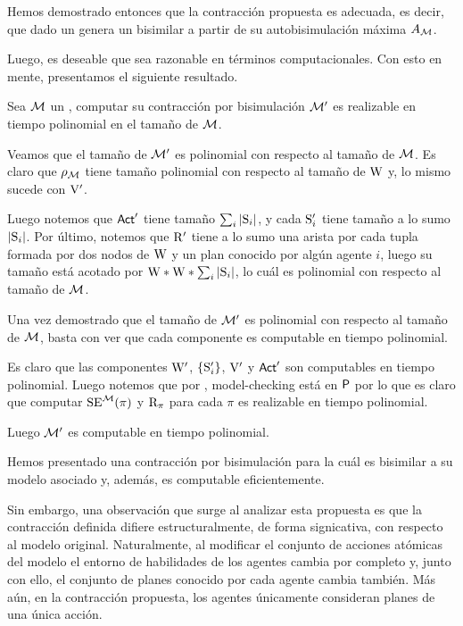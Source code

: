 Hemos demostrado entonces que la contracción propuesta es adecuada, es decir, que dado un \ults genera un \ults bisimilar a partir de su 
autobisimulación máxima $A_\modults$.

Luego, es deseable que sea razonable en términos computacionales. Con esto en mente, presentamos el siguiente resultado.


\begin{teorema}
    Sea $\modults$ un \ults, computar su contracción por bisimulación $\modults'$ es realizable en tiempo polinomial en el 
    tamaño de $\modults$.
\end{teorema}

\begin{demostracion}
    Veamos que el tamaño de $\modults'$ es polinomial con respecto al tamaño de $\modults$. Es claro que $\rho_\model$ tiene tamaño 
    polinomial con respecto al tamaño de $\W$ y, lo mismo sucede con $\V'$. 

    Luego notemos que $\ACT'$ tiene tamaño $\sum_{i} |\S_i|$, y cada $\S_i'$ tiene tamaño a lo sumo $|\S_i|$. Por último, notemos que 
    $\R'$ tiene a lo sumo una arista por cada tupla formada por dos nodos de $\W$ y un plan conocido por algún agente $i$, luego su 
    tamaño está acotado por $\W * \W * \sum_{i}|\S_i|$, lo cuál es polinomial con respecto al tamaño de $\modults$.

    Una vez demostrado que el tamaño de $\modults'$ es polinomial con respecto al tamaño de $\modults$, basta con ver que cada componente 
    es computable en tiempo polinomial. 

    Es claro que las componentes $\W'$, $\{\S_i'\}$, $\V'$ y $\ACT'$ son computables en tiempo polinomial. Luego notemos que por 
    , model-checking está en $\Poly$ por lo que es claro que computar $\sexec^{\model}(\pi)$ y $\R_\pi$
    para cada $\pi$ es realizable en tiempo polinomial.

    Luego $\modults'$ es computable en tiempo polinomial.
\end{demostracion}

Hemos presentado una contracción por bisimulación para \KHilogic la cuál es bisimilar a su modelo asociado y, además, 
es computable eficientemente.

Sin embargo, una observación que surge al analizar esta propuesta es que la contracción definida difiere estructuralmente, de 
forma signicativa, con respecto al modelo original. 
Naturalmente, al modificar el conjunto de acciones atómicas del modelo el entorno de habilidades de los agentes cambia por completo y, 
junto con ello, el conjunto de planes conocido por cada agente cambia también. Más aún, en la contracción propuesta, los agentes 
únicamente consideran planes de una única acción.

